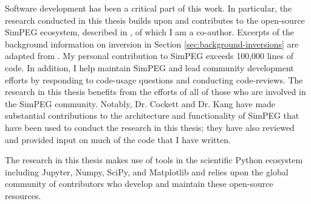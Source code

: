 Software development has been a critical part of this work. In particular, the research conducted in this thesis builds upon and contributes to the open-source SimPEG ecosystem, described in \cite{Cockett2015}, of which I am a co-author. Excerpts of the background information on inversion in Section \ref{sec:background-inversions} are adapted from \cite{Cockett2015}. My personal contribution to SimPEG exceeds 100,000 lines of code. In addition, I help maintain SimPEG and lead community development efforts by responding to code-usage questions and conducting code-reviews. The research in this thesis benefits from the efforts of all of those who are involved in the SimPEG community. Notably, Dr. Cockett and Dr. Kang have made substantial contributions to the architecture and functionality of SimPEG that have been used to conduct the research in this thesis; they have also reviewed and provided input on much of the code that I have written.

The research in this thesis makes use of tools in the scientific Python ecosystem including Jupyter, Numpy, SciPy, and Matplotlib \citep{Perez2015, numpy, Jones2001, matplotlib} and relies upon the global community of contributors who develop and maintain these open-source resources.
